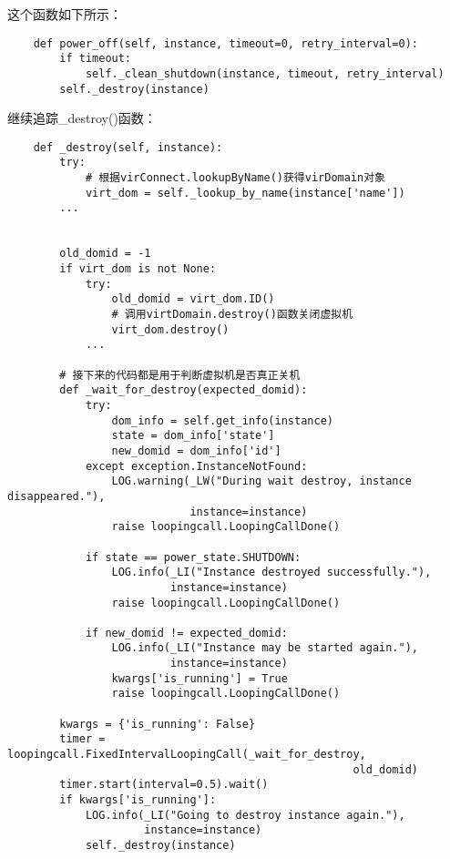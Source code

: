 \documentclass[a4paper,left=1.5cm,right=1.5cm,11pt]{article}
\begin{document}
	这个函数如下所示：
	\begin{lstlisting}
	def power_off(self, instance, timeout=0, retry_interval=0):
        if timeout:
            self._clean_shutdown(instance, timeout, retry_interval)
        self._destroy(instance)
	\end{lstlisting}

	继续追踪\_destroy()函数：
	\begin{lstlisting}
	def _destroy(self, instance):
        try:
			# 根据virConnect.lookupByName()获得virDomain对象
            virt_dom = self._lookup_by_name(instance['name'])
        ...

        
        old_domid = -1
        if virt_dom is not None:
            try:
                old_domid = virt_dom.ID()
				# 调用virtDomain.destroy()函数关闭虚拟机
                virt_dom.destroy()
            ...
		
		# 接下来的代码都是用于判断虚拟机是否真正关机
        def _wait_for_destroy(expected_domid):
            try:
                dom_info = self.get_info(instance)
                state = dom_info['state']
                new_domid = dom_info['id']
            except exception.InstanceNotFound:
                LOG.warning(_LW("During wait destroy, instance disappeared."),
                            instance=instance)
                raise loopingcall.LoopingCallDone()

            if state == power_state.SHUTDOWN:
                LOG.info(_LI("Instance destroyed successfully."),
                         instance=instance)
                raise loopingcall.LoopingCallDone()

            if new_domid != expected_domid:
                LOG.info(_LI("Instance may be started again."),
                         instance=instance)
                kwargs['is_running'] = True
                raise loopingcall.LoopingCallDone()

        kwargs = {'is_running': False}
        timer = loopingcall.FixedIntervalLoopingCall(_wait_for_destroy,
                                                     old_domid)
        timer.start(interval=0.5).wait()
        if kwargs['is_running']:
            LOG.info(_LI("Going to destroy instance again."),
                     instance=instance)
            self._destroy(instance)
	\end{lstlisting}

\clearpage
\end{document}
